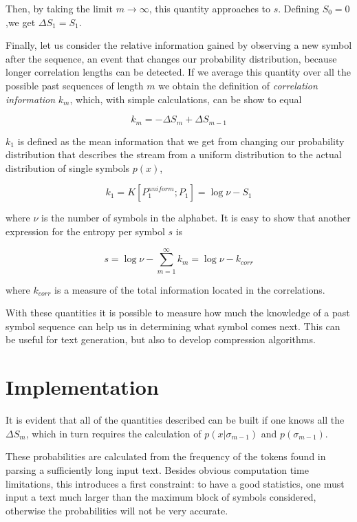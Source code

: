 \documentclass[11pt]{article} %
\begin{document}
Then, by taking the limit $m\rightarrow\infty$, this quantity approaches to $s$. Defining $S_0 = 0$,we get $\Delta S_1 = S_1$.

Finally, let us consider the relative information gained by observing a new symbol after the sequence, an event that changes our probability distribution, because longer correlation lengths can be detected. If we average this quantity over all the possible past sequences of length $m$ we obtain the definition of \emph{correlation information} $k_m$, which, with simple calculations, can be show to equal

\begin{dmath}
k_m = -\Delta S_m + \Delta S_{m-1}
\end{dmath}

$k_1$ is defined as the mean information that we get from changing our probability distribution that describes the stream from a uniform distribution to the actual distribution of single symbols $p(x)$,

\begin{dmath}
k_1 = K[P_1^{uniform}; P_1] = \log \nu - S_1
\end{dmath}

where $\nu$ is the number of symbols in the alphabet. It is easy to show that another expression for the entropy per symbol $s$ is

\begin{dmath}
s = \log \nu - \sum_{m=1}^\infty k_m = \log \nu - k_{corr}
\end{dmath}

where $k_{corr}$ is a measure of the total information located in the correlations.

With these quantities it is possible to measure how much the knowledge of a past symbol sequence can help us in determining what symbol comes next. This can be useful for text generation, but also to develop compression algorithms.

\section{Implementation}

It is evident that all of the quantities described can be built if one knows all the $\Delta S_m$, which in turn requires the calculation of $p(x|\sigma_{m-1})$ and $p(\sigma_{m-1})$.

These probabilities are calculated from the frequency of the tokens found in parsing a sufficiently long input text. Besides obvious computation time limitations, this introduces a first constraint: to have a good statistics, one must input a text much larger than the maximum block of symbols considered, otherwise the probabilities will not be very accurate.
\end{document}
